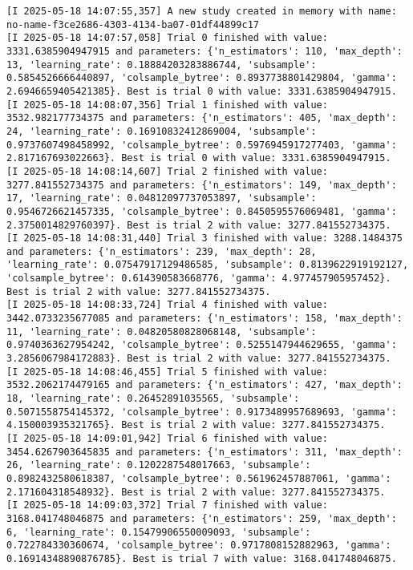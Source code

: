 \documentclass[
  letterpaper,
  DIV=11,
  numbers=noendperiod]{scrreprt}
\begin{document}
\begin{verbatim}
[I 2025-05-18 14:07:55,357] A new study created in memory with name: no-name-f3ce2686-4303-4134-ba07-01df44899c17
[I 2025-05-18 14:07:57,058] Trial 0 finished with value: 3331.6385904947915 and parameters: {'n_estimators': 110, 'max_depth': 13, 'learning_rate': 0.18884203283886744, 'subsample': 0.5854526666440897, 'colsample_bytree': 0.8937738801429804, 'gamma': 2.6946659405421385}. Best is trial 0 with value: 3331.6385904947915.
[I 2025-05-18 14:08:07,356] Trial 1 finished with value: 3532.982177734375 and parameters: {'n_estimators': 405, 'max_depth': 24, 'learning_rate': 0.16910832412869004, 'subsample': 0.9737607498458992, 'colsample_bytree': 0.5976945917277403, 'gamma': 2.817167693022663}. Best is trial 0 with value: 3331.6385904947915.
[I 2025-05-18 14:08:14,607] Trial 2 finished with value: 3277.841552734375 and parameters: {'n_estimators': 149, 'max_depth': 17, 'learning_rate': 0.04812097737053897, 'subsample': 0.9546726621457335, 'colsample_bytree': 0.8450595576069481, 'gamma': 2.3750014829760397}. Best is trial 2 with value: 3277.841552734375.
[I 2025-05-18 14:08:31,440] Trial 3 finished with value: 3288.1484375 and parameters: {'n_estimators': 239, 'max_depth': 28, 'learning_rate': 0.07547917129486585, 'subsample': 0.8139622919192127, 'colsample_bytree': 0.614390583668776, 'gamma': 4.977457905957452}. Best is trial 2 with value: 3277.841552734375.
[I 2025-05-18 14:08:33,724] Trial 4 finished with value: 3442.0733235677085 and parameters: {'n_estimators': 158, 'max_depth': 11, 'learning_rate': 0.04820580828068148, 'subsample': 0.9740363627954242, 'colsample_bytree': 0.5255147944629655, 'gamma': 3.2856067984172883}. Best is trial 2 with value: 3277.841552734375.
[I 2025-05-18 14:08:46,455] Trial 5 finished with value: 3532.2062174479165 and parameters: {'n_estimators': 427, 'max_depth': 18, 'learning_rate': 0.26452891035565, 'subsample': 0.5071558754145372, 'colsample_bytree': 0.9173489957689693, 'gamma': 4.150003935321765}. Best is trial 2 with value: 3277.841552734375.
[I 2025-05-18 14:09:01,942] Trial 6 finished with value: 3454.6267903645835 and parameters: {'n_estimators': 311, 'max_depth': 26, 'learning_rate': 0.1202287548017663, 'subsample': 0.8982432580618387, 'colsample_bytree': 0.561962457887061, 'gamma': 2.171604318548932}. Best is trial 2 with value: 3277.841552734375.
[I 2025-05-18 14:09:03,372] Trial 7 finished with value: 3168.041748046875 and parameters: {'n_estimators': 259, 'max_depth': 6, 'learning_rate': 0.15479906550009093, 'subsample': 0.722784330360674, 'colsample_bytree': 0.9717808152882963, 'gamma': 0.16914348890876785}. Best is trial 7 with value: 3168.041748046875.

\end{verbatim}
\end{document}
